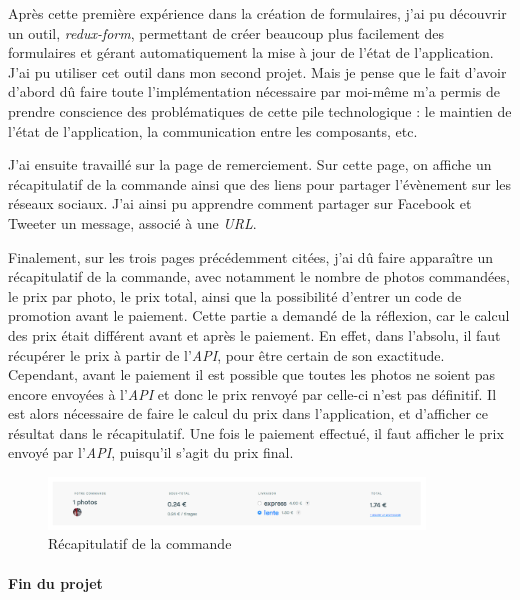 \documentclass[12pt,a4paper]{article}
\begin{document}
  Après cette première expérience dans la création de formulaires, j'ai pu
  découvrir un outil, \emph{redux-form}, permettant de créer beaucoup plus
  facilement des formulaires et gérant automatiquement la mise à jour de
  l'état de l'application. J'ai pu utiliser cet outil dans mon second
  projet. Mais je pense que le fait d'avoir d'abord dû faire toute
  l'implémentation nécessaire par moi-même m'a permis de prendre
  conscience des problématiques de cette pile technologique : le maintien
  de l'état de l'application, la communication entre les composants, etc.

  \bigskip

  J'ai ensuite travaillé sur la page de remerciement. Sur cette page, on
  affiche un récapitulatif de la commande ainsi que des liens pour
  partager l'évènement sur les réseaux sociaux. J'ai ainsi pu apprendre
  comment partager sur Facebook et Tweeter un message, associé à une
  \emph{URL}.

  \bigskip

  Finalement, sur les trois pages précédemment citées, j'ai dû faire
  apparaître un récapitulatif de la commande, avec notamment le nombre de
  photos commandées, le prix par photo, le prix total, ainsi que la
  possibilité d'entrer un code de promotion avant le paiement. Cette
  partie a demandé de la réflexion, car le calcul des prix était différent
  avant et après le paiement. En effet, dans l'absolu, il faut récupérer
  le prix à partir de l'\emph{API}, pour être certain de son exactitude.
  Cependant, avant le paiement il est possible que toutes les photos ne
  soient pas encore envoyées à l'\emph{API} et donc le prix renvoyé par
  celle-ci n'est pas définitif. Il est alors nécessaire de faire le calcul
  du prix dans l'application, et d'afficher ce résultat dans le
  récapitulatif. Une fois le paiement effectué, il faut afficher le prix
  envoyé par l'\emph{API}, puisqu'il s'agit du prix final.

  \begin{figure}[h]
    \centering
    \includegraphics[width=10cm]{figures/photolix-2.png}
    \caption{Récapitulatif de la commande}
  \end{figure}

  \bigskip

  \paragraph{Fin du projet}\label{fin-du-projet}
\end{document}
